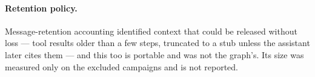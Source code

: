 \paragraph{Retention policy.} Message-retention accounting identified
context that could be released without loss --- tool results older than a
few steps, truncated to a stub unless the assistant later cites them ---
and this too is portable and was not the graph's. Its size was measured
only on the excluded campaigns and is not reported.
